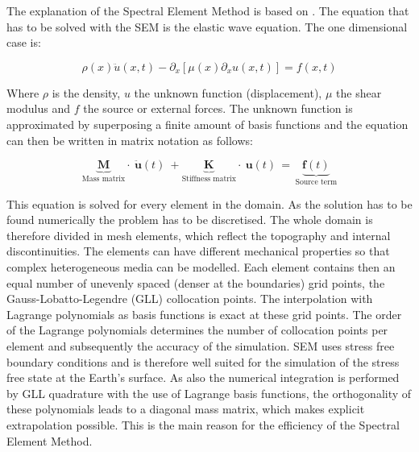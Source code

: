 The explanation of the Spectral Element Method is based on \citep{Igel_unpublished}.
The equation that has to be solved with the SEM is the elastic wave equation. The one dimensional case is: 

\begin{equation}\label{1Dwave}
\rho(x) \ddot{u}(x,t) -  \partial_x \left[ \mu(x) \partial_x u(x,t) \right] = f(x,t)
\end{equation}

Where $\rho$ is the density, $u$ the unknown function (displacement), $\mu$ the shear modulus and $f$ the source or external forces.
%
The unknown function is approximated by superposing a finite amount of basis functions and the equation can then be written in matrix 
notation as follows: 

\begin{equation}\label{matrix_equation}
\underbrace{\textbf{M}}_{\text{Mass matrix}} \cdot \ \ddot{\textbf {u}} (t)  \ + \underbrace{\textbf{K}}_{\text{Stiffness matrix}} \cdot \ \textbf{u} (t) \, = \, \underbrace{\textbf{f} (t)}_{\text{Source term}} 
\end{equation}

%

This equation is solved for every element in the domain. 
As the solution has to be found numerically the problem has to be discretised. 
The whole domain is therefore divided in mesh elements, which reflect the topography and internal discontinuities.
The elements can have different mechanical properties so that complex heterogeneous media can be modelled. 
Each element contains then an equal number of unevenly spaced (denser at the boundaries) grid points, the 
Gauss-Lobatto-Legendre (GLL) collocation points.
The interpolation with Lagrange polynomials as basis functions is exact at these grid points. 
The order of the Lagrange polynomials determines the number of collocation points per element and subsequently the accuracy of the simulation. 
%
SEM uses stress free boundary conditions and is therefore well suited for the simulation of the stress free state at the Earth's surface. 
%
As also the numerical integration is performed by GLL quadrature with the use of Lagrange basis functions, 
the orthogonality of these polynomials leads to a diagonal mass matrix, which makes explicit extrapolation possible. 
This is the main reason for the efficiency of the Spectral Element Method.

